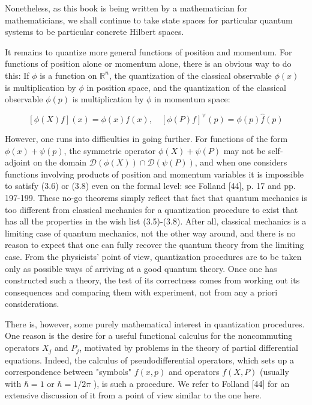 \documentclass[10pt, letterpaper]{article}
\begin{document}
Nonetheless, as this book is being written by a mathematician for mathematicians, we shall continue to take state spaces for particular quantum systems to be particular concrete Hilbert spaces.






It remains to quantize more general functions of position and momentum. For functions of position alone or momentum alone, there is an obvious way to do this: If $\phi$ is a function on $\mathbb{R}^{n}$, the quantization of the classical observable $\phi(x)$ is multiplication by $\phi$ in position space, and the quantization of the classical observable $\phi(p)$ is multiplication by $\phi$ in momentum space:

$$
[\phi(X) f](x)=\phi(x) f(x), \quad[\phi(P) f]^{\curlyvee}(p)=\phi(p) \widehat{f}(p)
$$

However, one runs into difficulties in going further. For functions of the form $\phi(x)+\psi(p)$, the symmetric operator $\phi(X)+\psi(P)$ may not be self-adjoint on the domain $\mathcal{D}(\phi(X)) \cap \mathcal{D}(\psi(P))$, and when one considers functions involving products of position and momentum variables it is impossible to satisfy (3.6) or (3.8) even on the formal level: see Folland [44], p. 17 and pp. 197-199. These no-go theorems simply reflect that fact that quantum mechanics is too different from classical mechanics for a quantization procedure to exist that has all the properties in the wish list (3.5)-(3.8). After all, classical mechanics is a limiting case of quantum mechanics, not the other way around, and there is no reason to expect that one can fully recover the quantum theory from the limiting case. From the physicists' point of view, quantization procedures are to be taken only as possible ways of arriving at a good quantum theory. Once one has constructed such a theory, the test of its correctness comes from working out its consequences and comparing them with experiment, not from any a priori considerations.

There is, however, some purely mathematical interest in quantization procedures. One reason is the desire for a useful functional calculus for the noncommuting operators $X_{j}$ and $P_{j}$, motivated by problems in the theory of partial differential equations. Indeed, the calculus of pseudodifferential operators, which sets up a correspondence between "symbols" $f(x, p)$ and operators $f(X, P)$ (usually with $\hbar=1$ or $\hbar=1 / 2 \pi$ ), is such a procedure. We refer to Folland [44] for an extensive discussion of it from a point of view similar to the one here.
\end{document}

